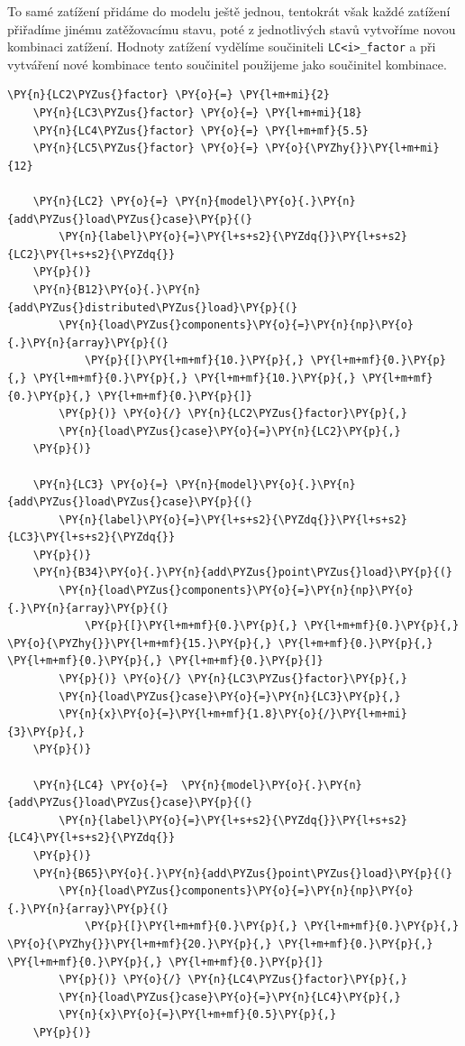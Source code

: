 To samé zatížení přidáme do modelu ještě jednou, tentokrát však každé zatížení přiřadíme jinému zatěžovacímu stavu, poté z jednotlivých stavů vytvoříme novou kombinaci zatížení. Hodnoty zatížení vydělíme součiniteli \texttt{LC<i>\_factor} a při vytváření nové kombinace tento součinitel použijeme jako součinitel kombinace.
\begin{tcolorbox}[breakable, size=fbox, boxrule=1pt, pad at break*=1mm,colback=cellbackground, colframe=cellborder]
    \begin{Verbatim}[commandchars=\\\{\}]
    \PY{n}{LC2\PYZus{}factor} \PY{o}{=} \PY{l+m+mi}{2}
    \PY{n}{LC3\PYZus{}factor} \PY{o}{=} \PY{l+m+mi}{18}
    \PY{n}{LC4\PYZus{}factor} \PY{o}{=} \PY{l+m+mf}{5.5}
    \PY{n}{LC5\PYZus{}factor} \PY{o}{=} \PY{o}{\PYZhy{}}\PY{l+m+mi}{12}
    
    \PY{n}{LC2} \PY{o}{=} \PY{n}{model}\PY{o}{.}\PY{n}{add\PYZus{}load\PYZus{}case}\PY{p}{(}
        \PY{n}{label}\PY{o}{=}\PY{l+s+s2}{\PYZdq{}}\PY{l+s+s2}{LC2}\PY{l+s+s2}{\PYZdq{}}
    \PY{p}{)}
    \PY{n}{B12}\PY{o}{.}\PY{n}{add\PYZus{}distributed\PYZus{}load}\PY{p}{(}
        \PY{n}{load\PYZus{}components}\PY{o}{=}\PY{n}{np}\PY{o}{.}\PY{n}{array}\PY{p}{(}
            \PY{p}{[}\PY{l+m+mf}{10.}\PY{p}{,} \PY{l+m+mf}{0.}\PY{p}{,} \PY{l+m+mf}{0.}\PY{p}{,} \PY{l+m+mf}{10.}\PY{p}{,} \PY{l+m+mf}{0.}\PY{p}{,} \PY{l+m+mf}{0.}\PY{p}{]}
        \PY{p}{)} \PY{o}{/} \PY{n}{LC2\PYZus{}factor}\PY{p}{,}
        \PY{n}{load\PYZus{}case}\PY{o}{=}\PY{n}{LC2}\PY{p}{,}
    \PY{p}{)}
    
    \PY{n}{LC3} \PY{o}{=} \PY{n}{model}\PY{o}{.}\PY{n}{add\PYZus{}load\PYZus{}case}\PY{p}{(}
        \PY{n}{label}\PY{o}{=}\PY{l+s+s2}{\PYZdq{}}\PY{l+s+s2}{LC3}\PY{l+s+s2}{\PYZdq{}}
    \PY{p}{)}
    \PY{n}{B34}\PY{o}{.}\PY{n}{add\PYZus{}point\PYZus{}load}\PY{p}{(}
        \PY{n}{load\PYZus{}components}\PY{o}{=}\PY{n}{np}\PY{o}{.}\PY{n}{array}\PY{p}{(}
            \PY{p}{[}\PY{l+m+mf}{0.}\PY{p}{,} \PY{l+m+mf}{0.}\PY{p}{,} \PY{o}{\PYZhy{}}\PY{l+m+mf}{15.}\PY{p}{,} \PY{l+m+mf}{0.}\PY{p}{,} \PY{l+m+mf}{0.}\PY{p}{,} \PY{l+m+mf}{0.}\PY{p}{]}
        \PY{p}{)} \PY{o}{/} \PY{n}{LC3\PYZus{}factor}\PY{p}{,}
        \PY{n}{load\PYZus{}case}\PY{o}{=}\PY{n}{LC3}\PY{p}{,}
        \PY{n}{x}\PY{o}{=}\PY{l+m+mf}{1.8}\PY{o}{/}\PY{l+m+mi}{3}\PY{p}{,}
    \PY{p}{)}
    
    \PY{n}{LC4} \PY{o}{=}  \PY{n}{model}\PY{o}{.}\PY{n}{add\PYZus{}load\PYZus{}case}\PY{p}{(}
        \PY{n}{label}\PY{o}{=}\PY{l+s+s2}{\PYZdq{}}\PY{l+s+s2}{LC4}\PY{l+s+s2}{\PYZdq{}}
    \PY{p}{)}
    \PY{n}{B65}\PY{o}{.}\PY{n}{add\PYZus{}point\PYZus{}load}\PY{p}{(}
        \PY{n}{load\PYZus{}components}\PY{o}{=}\PY{n}{np}\PY{o}{.}\PY{n}{array}\PY{p}{(}
            \PY{p}{[}\PY{l+m+mf}{0.}\PY{p}{,} \PY{l+m+mf}{0.}\PY{p}{,} \PY{o}{\PYZhy{}}\PY{l+m+mf}{20.}\PY{p}{,} \PY{l+m+mf}{0.}\PY{p}{,} \PY{l+m+mf}{0.}\PY{p}{,} \PY{l+m+mf}{0.}\PY{p}{]}
        \PY{p}{)} \PY{o}{/} \PY{n}{LC4\PYZus{}factor}\PY{p}{,}
        \PY{n}{load\PYZus{}case}\PY{o}{=}\PY{n}{LC4}\PY{p}{,}
        \PY{n}{x}\PY{o}{=}\PY{l+m+mf}{0.5}\PY{p}{,}
    \PY{p}{)}
    

\end{Verbatim}
\end{tcolorbox}
